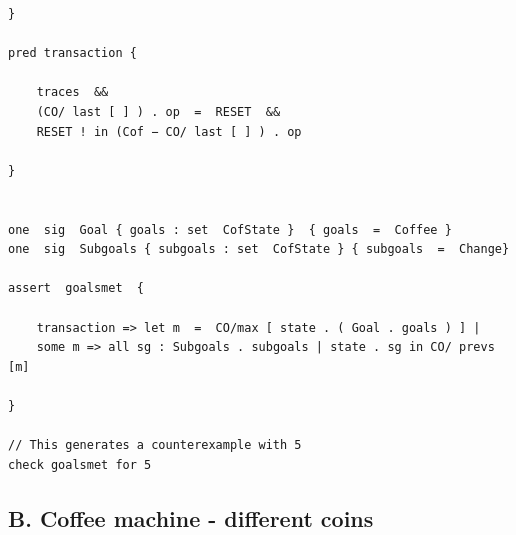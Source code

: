 \documentclass[a4paper,12pt]{extarticle}
\begin{document}
\begin{verbatim}
}

pred transaction {

	traces  &&
	(CO/ last [ ] ) . op  =  RESET  &&
	RESET ! in (Cof − CO/ last [ ] ) . op

}


one  sig  Goal { goals : set  CofState }  { goals  =  Coffee }
one  sig  Subgoals { subgoals : set  CofState } { subgoals  =  Change}

assert  goalsmet  {

	transaction => let m  =  CO/max [ state . ( Goal . goals ) ] |
	some m => all sg : Subgoals . subgoals | state . sg in CO/ prevs [m]

}

// This generates a counterexample with 5
check goalsmet for 5
\end{verbatim}
\clearpage
\subsection{B.  Coffee machine - different coins}
\end{document}

